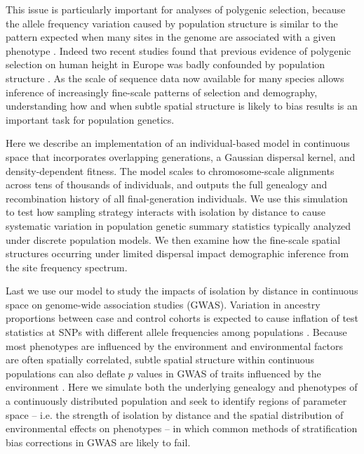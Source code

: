 \documentclass[10pt,twoside,lineno]{gsajnl}
\newif\ifcomments
\newcommand{\ak}[1]{\ifcomments{{\color{red} \it (#1)}}\else{}\fi}
\begin{document}
\ak{we should start by saying that we don't understand how simple summaries will respond to continuous space model}
This issue is particularly important for analyses of polygenic selection, because the allele frequency variation caused by population structure is similar to the pattern expected when many sites in the genome are associated with a given phenotype \citep{Bulik-Sullivan2015}. Indeed two recent studies found that previous evidence of polygenic selection on human height in Europe was badly confounded by population structure \citep{Sohail2018,Berg2018}. As the scale of sequence data now available for many species allows inference of increasingly fine-scale patterns of selection and demography, understanding how and when subtle spatial structure is likely to bias results is an important task for population genetics.

Here we describe an implementation of an individual-based model in continuous space that incorporates overlapping generations, a Gaussian dispersal kernel, and density-dependent fitness. The model scales to chromosome-scale alignments across tens of thousands of individuals, and outputs the full genealogy and recombination history of all final-generation individuals. We use this simulation to test how sampling strategy interacts with isolation by distance to cause systematic variation in population genetic summary statistics typically analyzed under discrete population models. We then examine how the fine-scale spatial structures occurring under limited dispersal impact demographic inference from the site frequency spectrum.

Last we use our model to study the impacts of isolation by distance in continuous space on genome-wide association studies (GWAS). Variation in ancestry proportions between case and control cohorts is expected to cause inflation of test statistics at SNPs with different allele frequencies among populations \citep{Price2006}. Because most phenotypes are influenced by the environment and environmental factors are often spatially correlated, subtle spatial structure within continuous populations can also deflate $p$ values in GWAS of traits influenced by the environment \citep{Mathieson2012}. Here we simulate both the underlying genealogy and phenotypes of a continuously distributed population and seek to identify regions of parameter space -- i.e. the strength of isolation by distance and the spatial distribution of environmental effects on phenotypes -- in which common methods of stratification bias corrections in GWAS are likely to fail. 
\end{document}
